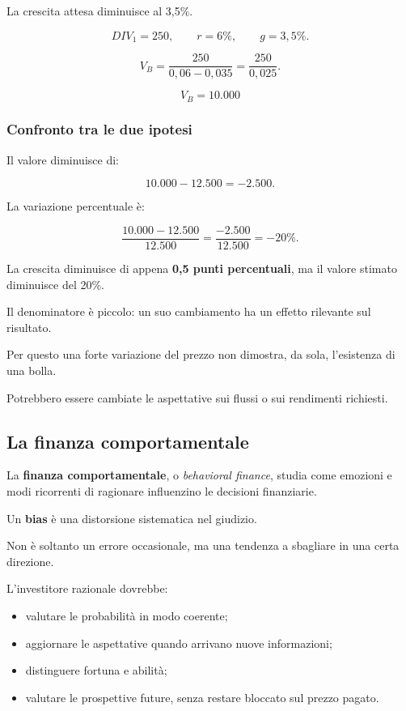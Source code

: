 \noindent La crescita attesa
diminuisce al 3,5\%.

\[
DIV_1=250,
\qquad r=6\%,
\qquad g=3{,}5\%.
\]

\[
V_B
=
\frac{250}{0{,}06-0{,}035}
=
\frac{250}{0{,}025}.
\]

\[
\boxed{V_B=10.000}
\]


\subsubsection*{Confronto tra le due ipotesi}

\noindent Il valore diminuisce di:

\[
10.000-12.500=-2.500.
\]

\noindent La variazione percentuale è:

\[
\frac{10.000-12.500}{12.500}
=
\frac{-2.500}{12.500}
=
\boxed{-20\%}.
\]

\medskip

\noindent La crescita diminuisce
di appena \textbf{0,5 punti percentuali},
ma il valore stimato diminuisce del 20\%.

\noindent Il denominatore è piccolo:
un suo cambiamento ha un effetto rilevante
sul risultato.

\medskip

\noindent Per questo una forte variazione
del prezzo non dimostra, da sola,
l'esistenza di una bolla.

\noindent Potrebbero essere cambiate
le aspettative sui flussi
o sui rendimenti richiesti.


\subsection{La finanza comportamentale}

\noindent La \textbf{finanza comportamentale},
o \textit{behavioral finance},
studia come emozioni e modi ricorrenti
di ragionare influenzino
le decisioni finanziarie.

\noindent Un \textbf{bias}
è una distorsione sistematica nel giudizio.

\noindent Non è soltanto un errore occasionale,
ma una tendenza a sbagliare
in una certa direzione.

\medskip

\noindent L'investitore razionale dovrebbe:

\begin{itemize}
    \item valutare le probabilità
    in modo coerente;

    \item aggiornare le aspettative
    quando arrivano nuove informazioni;

    \item distinguere fortuna e abilità;

    \item valutare le prospettive future,
    senza restare bloccato sul prezzo pagato.
\end{itemize}

